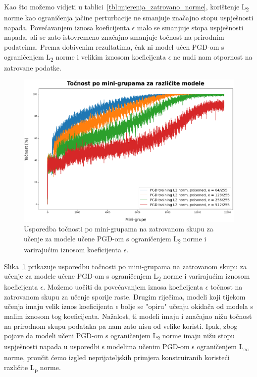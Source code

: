 \documentclass[times, utf8, zavrsni, numeric]{fer}
\begin{document}
Kao što možemo vidjeti u tablici~\ref{tbl:mjerenja_zatrovano_norme}, korištenje L\textsubscript{2} norme kao ograničenja jačine perturbacije ne smanjuje značajno stopu uspješnosti napada.
Povećavanjem iznosa koeficijenta $\epsilon$ malo se smanjuje stopa uspješnosti napada, ali se zato istovremeno značajno smanjuje točnost na prirodnim podatcima.
Prema dobivenim rezultatima, čak ni model učen PGD-om s ograničenjem L\textsubscript{2} norme i velikim iznosom koeficijenta $\epsilon$ ne nudi nam otpornost na zatrovane podatke.

\pagebreak

\begin{figure}[htb]
    \centering
    \includegraphics[scale=0.4]{../stats/train_accuracy_comparison_pgd_l2_only.png}
    \caption{Usporedba točnosti po mini-grupama na zatrovanom skupu za učenje za modele učene PGD-om s ograničenjem L\textsubscript{2} norme i varirajućim iznosom koeficijenta $\epsilon$.}
    \label{fig:pgd_l2_comparison}
\end{figure}

Slika~\ref{fig:pgd_l2_comparison} prikazuje usporedbu točnosti po mini-grupama na zatrovanom skupu za učenje za modele učene PGD-om s ograničenjem L\textsubscript{2} norme i varirajućim iznosom koeficijenta $\epsilon$.
Možemo uočiti da povećavanjem iznosa koeficijenta $\epsilon$ točnost na zatrovanom skupu za učenje sporije raste. 
Drugim riječima, modeli koji tijekom učenja imaju velik iznos koeficijenta $\epsilon$ bolje se "opiru" učenju okidača od modela s malim iznosom tog koeficijenta. 
Nažalost, ti modeli imaju i značajno nižu točnost na prirodnom skupu podataka pa nam zato nisu od velike koristi.
Ipak, zbog pojave da modeli učeni PGD-om s ograničenjem L\textsubscript{2} norme imaju nižu stopu uspješnosti napada u usporedbi s modelima učenim PGD-om s ograničenjem L\textsubscript{$\infty$} norme, proučit ćemo izgled neprijateljskih primjera konstruiranih koristeći različite L\textsubscript{p} norme. %
\end{document}
